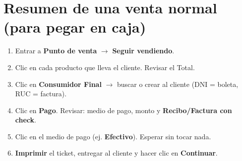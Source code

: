 \documentclass[12pt,a4paper]{article}
\begin{document}
\clearpage
\section*{Resumen de una venta normal (para pegar en caja)}

\begin{enumerate}
  \item Entrar a \textbf{Punto de venta} $\rightarrow$ \textbf{Seguir vendiendo}.
  \item Clic en cada producto que lleva el cliente. Revisar el Total.
  \item Clic en \textbf{Consumidor Final} $\rightarrow$ buscar o crear al cliente
  (DNI = boleta, RUC = factura).
  \item Clic en \textbf{Pago}. Revisar: medio de pago, monto y
  \textbf{Recibo/Factura con check}.
  \item Clic en el medio de pago (ej. \textbf{Efectivo}). Esperar sin tocar nada.
  \item \textbf{Imprimir} el ticket, entregar al cliente y hacer clic en
  \textbf{Continuar}.
\end{enumerate}
\end{document}
